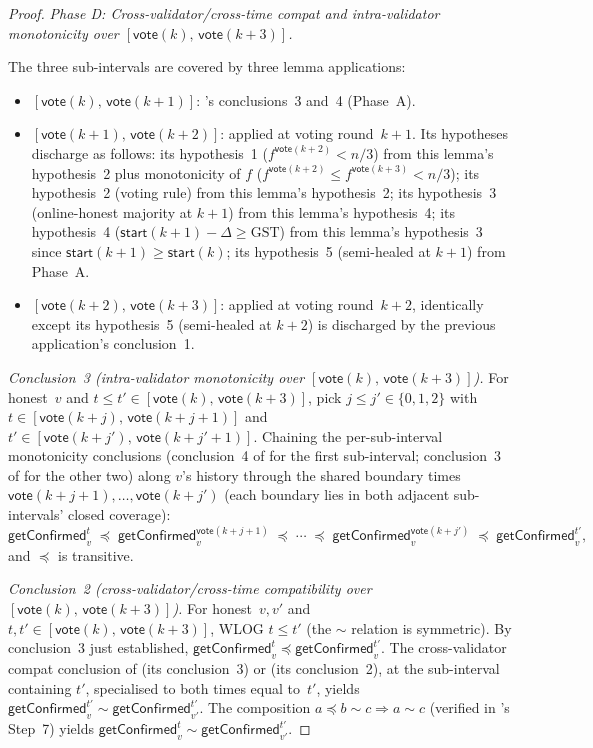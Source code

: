 \ifx\litemode\undefined\documentclass{article}\fi
\newcommand{\start}{\ensuremath{\mathsf{start}}}
\newcommand{\vote}{\ensuremath{\mathsf{vote}}}
\newcommand{\GST}{\ensuremath{\mathrm{GST}}\xspace}
\newcommand{\getConfirmed}{\textsf{getConfirmed}\xspace}
\theoremstyle{plain}
\theoremstyle{definition}
\theoremstyle{remark}
\begin{document}
\begin{proof}
\medskip
\noindent\emph{Phase D: Cross-validator/cross-time compat and intra-validator monotonicity over $[\vote(k),\, \vote(k+3)]$.}

The three sub-intervals are covered by three lemma applications:
\begin{itemize}
  \item $[\vote(k),\, \vote(k+1)]$: 's conclusions~3 and~4 (Phase~A).
  \item $[\vote(k+1),\, \vote(k+2)]$:  applied at voting round~$k+1$. Its hypotheses discharge as follows: its hypothesis~1 ($f^{\vote(k+2)} < n/3$) from this lemma's hypothesis~2 plus monotonicity of $f$ ($f^{\vote(k+2)} \leq f^{\vote(k+3)} < n/3$); its hypothesis~2 (voting rule) from this lemma's hypothesis~2; its hypothesis~3 (online-honest majority at $k+1$) from this lemma's hypothesis~4; its hypothesis~4 ($\start(k+1) - \Delta \geq \GST$) from this lemma's hypothesis~3 since $\start(k+1) \geq \start(k)$; its hypothesis~5 (semi-healed at $k+1$) from Phase~A.
  \item $[\vote(k+2),\, \vote(k+3)]$:  applied at voting round~$k+2$, identically except its hypothesis~5 (semi-healed at $k+2$) is discharged by the previous application's conclusion~1.
\end{itemize}

\emph{Conclusion~3 (intra-validator monotonicity over $[\vote(k),\, \vote(k+3)]$).}
For honest~$v$ and $t \leq t' \in [\vote(k),\, \vote(k+3)]$, pick $j \leq j' \in \{0, 1, 2\}$ with $t \in [\vote(k+j),\, \vote(k+j+1)]$ and $t' \in [\vote(k+j'),\, \vote(k+j'+1)]$. Chaining the per-sub-interval monotonicity conclusions (conclusion~4 of  for the first sub-interval; conclusion~3 of  for the other two) along $v$'s history through the shared boundary times $\vote(k+j+1), \ldots, \vote(k+j')$ (each boundary lies in both adjacent sub-intervals' closed coverage):
\[
  \getConfirmed_v^{t} \;\preceq\; \getConfirmed_v^{\vote(k+j+1)} \;\preceq\; \cdots \;\preceq\; \getConfirmed_v^{\vote(k+j')} \;\preceq\; \getConfirmed_v^{t'},
\]
and $\preceq$ is transitive.

\emph{Conclusion~2 (cross-validator/cross-time compatibility over $[\vote(k),\, \vote(k+3)]$).}
For honest~$v, v'$ and $t, t' \in [\vote(k),\, \vote(k+3)]$, WLOG $t \leq t'$ (the $\sim$ relation is symmetric). By conclusion~3 just established, $\getConfirmed_v^{t} \preceq \getConfirmed_v^{t'}$. The cross-validator compat conclusion of  (its conclusion~3) or  (its conclusion~2), at the sub-interval containing $t'$, specialised to both times equal to~$t'$, yields $\getConfirmed_v^{t'} \sim \getConfirmed_{v'}^{t'}$. The composition $a \preceq b \sim c \Rightarrow a \sim c$ (verified in 's Step~7) yields $\getConfirmed_v^{t} \sim \getConfirmed_{v'}^{t'}$.
\end{proof}
\end{document}
